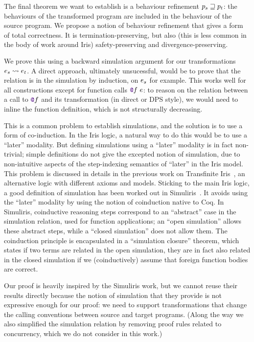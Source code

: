 The final theorem we want to establish is a behaviour refinement $\datalangProg_s \refined \datalangProg_t$: the behaviours of the transformed program are included in the behaviour of the source program.
%
We propose a notion of behaviour refinement that gives a form of total correctness.
%
It is termination-preserving, but also (this is less common in the body of work around Iris) safety-preserving and divergence-preserving.

We prove this using a backward simulation argument for our transformations $\datalangExpr_s \tmc \datalangExpr_t$.
%
A direct approach, ultimately unsucessful, would be to prove that the relation is in the simulation by induction, on $\datalangExpr_s$ for example.
%
This works well for all constructions except for function calls $\datalangCall{\datalangFnptr{\datalangFn}}{\datalangExpr}$: to reason on the relation between a call to $\datalangFnptr{\datalangFn}$ and its transformation (in direct or DPS style), we would need to inline the function definition, which is not structurally decreasing.

This is a common problem to establish simulations, and the solution is to use a form of co-induction.
%
In the Iris logic, a natural way to do this would be to use a ``later'' modality.
%
But defining simulations using a ``later'' modality is in fact non-trivial; simple definitions do not give the excepted notion of simulation, due to non-intuitive aspects of the step-indexing semantics of ``later'' in the Iris model. This problem is discussed in details in the previous work on Transfinite Iris~\citep*{TODO-transfinite-Iris}, an alternative logic with different axioms and models.
%
Sticking to the main Iris logic, a good definition of simulation has been worked out in Simuliris~\citep*{TODO-Simuliris}.
%
It avoids using the ``later'' modality by using the notion of coinduction native to Coq. In Simuliris, coinductive reasoning steps correspond to an ``abstract'' case in the simulation relation, used for function applications; an ``open simulation'' allows these abstract steps, while a ``closed simulation'' does not allow them.
%
The coinduction principle is encapsulated in a ``simulation closure'' theorem, which states if two terms are related in the open simulation, they are in fact also related in the closed simulation if we (coinductively) assume that foreign function bodies are correct.

Our proof is heavily inspired by the Simuliris work, but we cannot reuse their results directly because the notion of simulation that they provide is not expressive enough for our proof: we need to support transformations that change the calling conventions between source and target programs.
%
(Along the way we also simplified the simulation relation by removing proof rules related to concurrency, which we do not consider in this work.)


